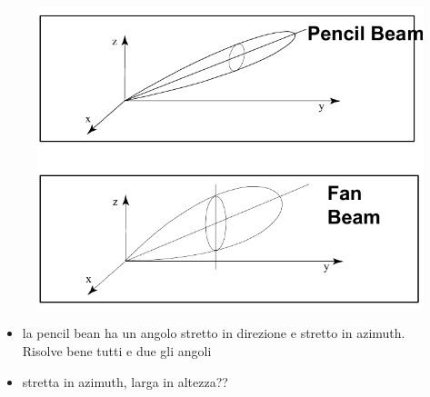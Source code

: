 \documentclass[oneside, 12pt]{extbook}
\begin{document}
\begin{figure}[!h]
	\includegraphics[scale=0.5]{immagini/localization/tipi_antenne.png}
\end{figure}

\begin{itemize}
	\item la pencil bean ha un angolo stretto in direzione e stretto in azimuth.\\Risolve bene tutti e due gli angoli
	\item stretta in azimuth, larga in altezza??
\end{itemize}
\end{document}
